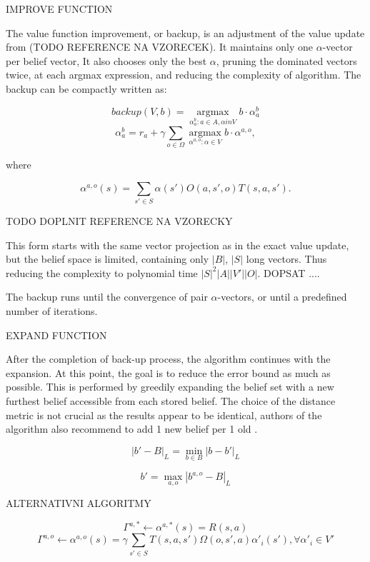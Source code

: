 IMPROVE FUNCTION

The value function improvement, or backup, is an adjustment of the value update from (TODO REFERENCE NA VZORECEK). It maintains only one $\alpha$-vector per belief vector, It also chooses only the best $\alpha$, pruning the dominated vectors twice, at each argmax expression, and reducing the complexity of algorithm. The backup can be compactly written as:

$$backup(V, b) = \operatorname*{argmax}_{\alpha_{a}^{b}:a \in A, \alpha in V} b \cdot \alpha_{a}^{b}$$
$$\alpha_{a}^{b} = r_a + \gamma \sum_{o \in \Omega} \operatorname*{argmax}_{\alpha^{a, o}:\alpha \in V} b \cdot \alpha^{a, o},$$

where

$$\alpha^{a, o} (s) = \sum_{s' \in S} \alpha (s') O (a, s', o) T(s, a, s').$$

TODO DOPLNIT REFERENCE NA VZORECKY

This form starts with the same vector projection as in the exact value update, but the belief space is limited, containing only $|B|$, $|S|$ long vectors. Thus reducing the complexity to polynomial time $|S|^2|A||V'||O|$.  
DOPSAT ....

The backup runs until the convergence of pair $\alpha$-vectors, or until a predefined number of iterations.

EXPAND FUNCTION

After the completion of back-up process, the algorithm continues with the expansion. At this point, the goal is to reduce the error bound as much as possible. This is performed by greedily expanding the belief set with a new furthest belief accessible from each stored belief. The choice of the distance metric is not crucial as the results appear to be identical, authors of the algorithm also recommend to add 1 new belief per 1 old \cite{pbvi}.

$$|b' - B|_L = \operatorname*{min}_{b \in B} |b - b'|_L$$

$$b' = \operatorname*{max}_{a, o} |b^{a, o} - B|_L$$




ALTERNATIVNI ALGORITMY







$$\Gamma^{a, *} \xleftarrow{} \alpha^{a, *} (s) = R(s, a)$$
$$\Gamma^{a, o} \xleftarrow{} \alpha^{a, o} (s) = \gamma \sum_{s' \in S} T(s, a, s') \Omega (o, s', a) \alpha'_i (s'), \forall \alpha'_i \in V'$$





